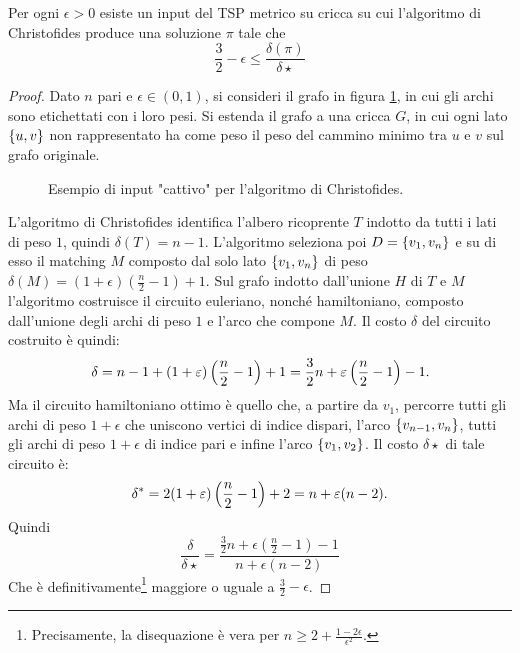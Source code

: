 \begin{theorem}
	Per ogni $\epsilon>0$ esiste un input del TSP metrico su cricca su cui l'algoritmo di Christofides produce una soluzione $\pi$ tale che
	\begin{equation*}
		\frac 3 2-\epsilon \leq \frac{\delta(\pi)}{\delta\star}
	\end{equation*}
\end{theorem}
\begin{proof}
	Dato $n$ pari e $\epsilon\in(0,1)$, si consideri il grafo in figura \ref{fig:christotight}, in cui gli archi sono etichettati con i loro pesi. Si estenda il grafo a una cricca $G$, in cui ogni lato $\set{u,v}$ non rappresentato ha come peso il peso del cammino minimo tra $u$ e $v$ sul grafo originale.

	\begin{figure}[ht]
		\centering
		
		\caption{Esempio di input "cattivo" per l'algoritmo di Christofides.}
		\label{fig:christotight}
	\end{figure}

	L'algoritmo di Christofides identifica l'albero ricoprente $T$ indotto da tutti i lati di peso $1$, quindi $\delta(T)=n-1$.
	L'algoritmo seleziona poi $D=\set{v_1,v_n}$ e su di esso il matching $M$ composto dal solo lato $\set{v_1,v_n}$ di peso $\delta(M)=(1+\epsilon)\left(\frac n2-1\right)+1$.
	Sul grafo indotto dall'unione $H$ di $T$ e $M$ l'algoritmo costruisce il circuito euleriano, nonché hamiltoniano, composto dall'unione degli archi di peso $1$ e l'arco che compone $M$.
	Il costo $\delta$ del circuito costruito è quindi:
	\begin{equation*}
		\delta = n-1 + (1+\epsilon)\left(\frac n2-1\right)+1 = \frac32n+\epsilon\left(\frac n2-1\right)-1 \text.
	\end{equation*}
	Ma il circuito hamiltoniano ottimo è quello che, a partire da $v_1$, percorre tutti gli archi di peso $1+\epsilon$ che uniscono vertici di indice dispari, l'arco $\set{v_{n-1},v_n}$, tutti gli archi di peso $1+\epsilon$ di indice pari e infine l'arco $\set{v_1,v_2}$.
	Il costo $\delta\star$ di tale circuito è:
	\begin{equation*}
		\delta\star = 2(1+\epsilon)\left(\frac n2-1\right) + 2 = n+\epsilon(n-2) \text.
	\end{equation*}
	Quindi
	\begin{equation*}
		\frac{\delta}{\delta\star} = \frac{\frac32n+\epsilon\left(\frac n2-1\right)-1}{n+\epsilon(n-2)}
	\end{equation*}
	Che è definitivamente\footnote{Precisamente, la disequazione è vera per $n\geq 2+\frac{1-2\epsilon}{\epsilon^2}$.} maggiore o uguale a $\frac 3 2-\epsilon$.

\end{proof}


